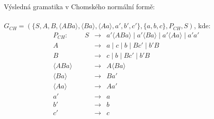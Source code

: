 \documentclass[a4paper,11pt]{article}[24.3.2010]
\begin{document}
\begin{enumerate}
\begin{enumerate}

        Výsledná gramatika v Chomského normální formě:\\\\$G_{CH} = (\{S,A,B,\langle ABa \rangle, \langle Ba \rangle, \langle Aa \rangle, a',b',c'\}, \{a,b,c\},P_{CH},S)$, kde:\\
      \begin{eqnarray*}
        P_{CH}: \:\:\:\:\:\:\:\:\:\:\: S&\rightarrow&a' \langle ABa \rangle \mid a' \langle Ba \rangle \mid a' \langle Aa \rangle \mid a'a'\\
        A&\rightarrow&a \mid c \mid b \mid Bc' \mid b'B\\
        B&\rightarrow&c \mid b \mid Bc' \mid b'B\\
       \langle ABa \rangle&\rightarrow&A\langle Ba \rangle\\
       \langle Ba \rangle&\rightarrow&Ba'\\
       \langle Aa \rangle&\rightarrow&Aa'\\
       a'&\rightarrow&a\\
       b'&\rightarrow&b\\
       c'&\rightarrow&c\\
      \end{eqnarray*}

    \end{enumerate}
    \renewcommand{\theenumi}{\arabic{enumi}}



\end{enumerate}
\end{document}
